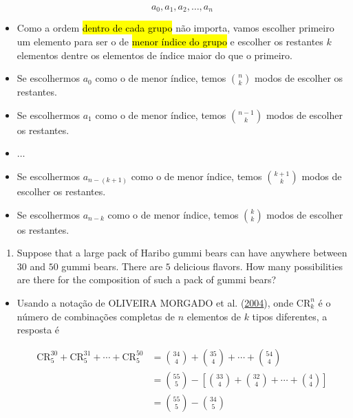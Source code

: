 \documentclass[
  11pt]{report}
\providecommand{\tightlist}{%
  \setlength{\itemsep}{0pt}\setlength{\parskip}{0pt}}
\begin{document}
\begin{itemize}
  \[
  a_0, a_1, a_2, \dots, a_n
  \]
\item
  Como a ordem {\hl{dentro de cada grupo}} não importa, vamos escolher primeiro um elemento para ser o de {\hl{menor índice do grupo}} e escolher os restantes $k$ elementos dentre os elementos de índice maior do que o primeiro.
\item
  Se escolhermos $a_0$ como o de menor índice, temos $\binom{n}{k}$ modos de escolher os restantes.
\item
  Se escolhermos $a_1$ como o de menor índice, temos $\binom{n - 1}{k}$ modos de escolher os restantes.
\item
  $\dots$
\item
  Se escolhermos $a_{n - (k+1)}$ como o de menor índice, temos $\binom{k + 1}{k}$ modos de escolher os restantes.
\item
  Se escolhermos $a_{n - k}$ como o de menor índice, temos $\binom{k}{k}$ modos de escolher os restantes.
\end{itemize}

\begin{rmdbox}

\begin{enumerate}
\def\labelenumi{(\alph{enumi})}
\setcounter{enumi}{1}
\tightlist
\item
  Suppose that a large pack of Haribo gummi bears can have anywhere between $30$ and $50$ gummi bears. There are $5$ delicious flavors. How many possibilities are there for the composition of such a pack of gummi bears?
\end{enumerate}

\end{rmdbox}

\begin{itemize}
\item
  Usando a notação de OLIVEIRA MORGADO et al. (\protect\hyperlink{ref-oliveira-2004-analis}{2004}), onde $\text{CR}_k^n$ é o número de combinações completas de $n$ elementos de $k$ tipos diferentes, a resposta é

  \[
  \begin{aligned}
    \text{CR}_5^{30} + \text{CR}_5^{31} + \cdots + \text{CR}_5^{50} 
    &=
    \binom{34}{4} + \binom{35}{4} + \cdots + \binom{54}{4} \\
    &= \binom{55}{5} - 
    \left[ 
    \binom{33}{4} + \binom{32}{4} + \cdots + \binom{4}{4}
    \right] \\
    &= \binom{55}{5} - \binom{34}{5}
  \end{aligned}
  \]
\end{itemize}
\end{document}
